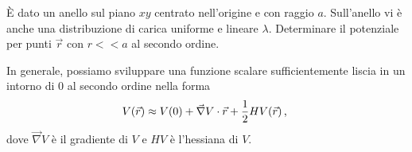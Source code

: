\documentclass[../main.tex]{subfiles}
\begin{document}

\textex
È dato un anello sul piano $xy$ centrato nell'origine e con raggio $a$. Sull'anello vi è anche una distribuzione di carica uniforme e lineare $\lambda$. Determinare il potenziale per punti $\vec{r}$ con $r<<a$ al secondo ordine.

\solution

In generale, possiamo sviluppare una funzione scalare sufficientemente liscia in un intorno di $0$ al secondo ordine nella forma
\begin{equation}\label{pca:sviluppoII}
	V(\vec{r})\approx V(0) + \vec{\nabla}V \cdot \vec{r} + \frac{1}{2}H V (\vec{r})\, \text{, }
\end{equation}
dove $\vec{\nabla}V$ è il gradiente di $V$ e $H V$ è l'hessiana di $V$.
\end{document}
